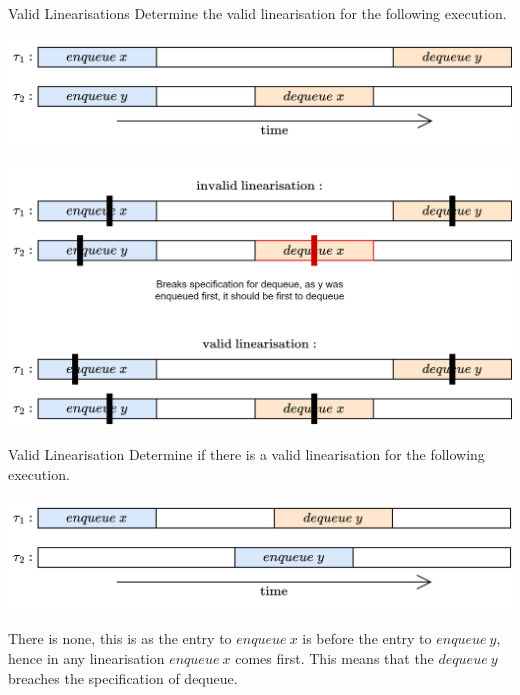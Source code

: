 \begin{examplebox}{Valid Linearisations}
	Determine the valid linearisation for the following execution.
	\begin{center}
		\includegraphics[width=.9\textwidth]{concurrent_objects/images/example_valid_linearisation.drawio.png}
	\end{center}
	\tcblower
	\begin{center}
		\includegraphics[width=.9\textwidth]{concurrent_objects/images/example_valid_linearisation_answer.drawio.png}
	\end{center}
\end{examplebox}

\begin{examplebox}{Valid Linearisation}
	Determine if there is a valid linearisation for the following execution.
	\begin{center}
		\includegraphics[width=.9\textwidth]{concurrent_objects/images/example_invalid_linearisation.drawio.png}
	\end{center}
	\tcblower
	There is none, this is as the entry to $enqueue \ x$ is before the entry to $enqueue \ y$, hence in any linearisation $enqueue \ x$ comes first. This means that the $dequeue \ y$ breaches the specification of dequeue.
\end{examplebox}

